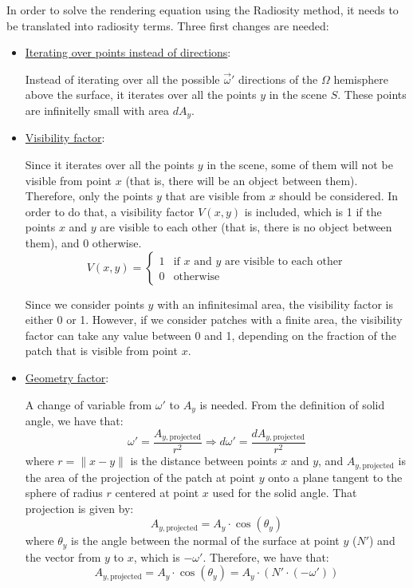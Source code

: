 In order to solve the rendering equation using the Radiosity method, it needs to be translated into radiosity terms. Three first changes are needed:
\begin{itemize}
    \item \ul{Iterating over points instead of directions}:
    
    Instead of iterating over all the possible $\vec{\omega}'$ directions of the $\Omega$ hemisphere above the surface, it iterates over all the points $y$ in the scene $S$. These points are infinitelly small with area $dA_y$.
    \item \ul{Visibility factor}:
    
    Since it iterates over all the points $y$ in the scene, some of them will not be visible from point $x$ (that is, there will be an object between them). Therefore, only the points $y$ that are visible from $x$ should be considered. In order to do that, a visibility factor $V(x, y)$ is included, which is 1 if the points $x$ and $y$ are visible to each other (that is, there is no object between them), and 0 otherwise.
    \begin{equation*}
    V(x, y) = \begin{cases}
        1 & \text{if $x$ and $y$ are visible to each other} \\
        0 & \text{otherwise}
    \end{cases}
    \end{equation*}
    \begin{observacion}
        Since we consider points $y$ with an infinitesimal area, the visibility factor is either 0 or 1. However, if we consider patches with a finite area, the visibility factor can take any value between 0 and 1, depending on the fraction of the patch that is visible from point $x$.
    \end{observacion}

    \item \ul{Geometry factor}:
    
    A change of variable from ${\omega}'$ to $A_y$ is needed. From the definition of solid angle, we have that:
    \begin{equation*}
        \omega' = \frac{A_{y,\text{projected}}}{r^2}
        \Longrightarrow
        d\omega' = \frac{dA_{y,\text{projected}}}{r^2}
    \end{equation*}
    where $r=\|x-y\|$ is the distance between points $x$ and $y$, and $A_{y,\text{projected}}$ is the area of the projection of the patch at point $y$ onto a plane tangent to the sphere of radius $r$ centered at point $x$ used for the solid angle. That projection is given by:
    \begin{equation*}
        A_{y,\text{projected}} = A_y \cdot \cos(\theta_y)
    \end{equation*}
    where $\theta_y$ is the angle between the normal of the surface at point $y$ ($N'$) and the vector from $y$ to $x$, which is $-\omega'$. Therefore, we have that:
    \begin{equation*}
        A_{y,\text{projected}} = A_y \cdot \cos(\theta_y) = A_y \cdot (N' \cdot (-\omega'))
    \end{equation*}


\end{itemize}
